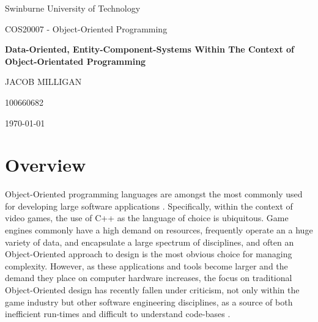 \documentclass[10pt]{scrartcl}
\begin{document}
	
	\begin{titlepage}
		
		\begin{centering}
		\large Swinburne University of Technology
		\par
		\large COS20007 - Object-Oriented Programming

		\vspace{4cm}

		\Huge \textbf{Data-Oriented, Entity-Component-Systems Within The Context of Object-Orientated Programming}

		\vspace{3cm}

		\Large JACOB MILLIGAN
		\par
		\Large 100660682
		\par

		\vfill

		\today

		\end{centering}



		\begin{tikzpicture}
			
		\end{tikzpicture}

	\end{titlepage}

	\tableofcontents

	\clearpage

	\section{Overview} %
	\label{sec:overview}

	Object-Oriented programming languages are amongst the most commonly used for developing large software applications \parencite{stack-survey}. Specifically, within the context of video games, the use of C++ as the language of choice is ubiquitous. Game engines commonly have a high demand on resources, frequently operate an a huge variety of data, and encapsulate a large spectrum of disciplines, and often an Object-Oriented approach to design is the most obvious choice for managing complexity. However, as these applications and tools become larger and the demand they place on computer hardware increases, the focus on traditional Object-Oriented design has recently fallen under criticism, not only within the game industry but other software engineering disciplines, as a source of both inefficient run-times and difficult to understand code-bases \parencite{llopis}. 
\end{document}
